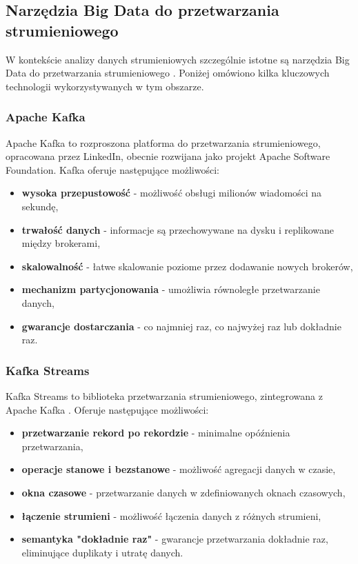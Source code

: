 \subsection{Narzędzia Big Data do przetwarzania strumieniowego}
\label{subsec:narzedzia_big_data}

W kontekście analizy danych strumieniowych szczególnie istotne są narzędzia Big Data do przetwarzania strumieniowego \cite{spark_streaming}.
Poniżej omówiono kilka kluczowych technologii wykorzystywanych w tym obszarze.

\subsubsection{Apache Kafka}
\label{subsubsec:apache_kafka}

Apache Kafka \cite{kafka} to rozproszona platforma do przetwarzania strumieniowego, opracowana przez LinkedIn, obecnie rozwijana jako projekt
Apache Software Foundation. Kafka oferuje następujące możliwości:

\begin{itemize}
    \item \textbf{wysoka przepustowość} - możliwość obsługi milionów wiadomości na sekundę,
    \item \textbf{trwałość danych} - informacje są przechowywane na dysku i replikowane między brokerami,
    \item \textbf{skalowalność} - łatwe skalowanie poziome przez dodawanie nowych brokerów,
    \item \textbf{mechanizm partycjonowania} - umożliwia równoległe przetwarzanie danych,
    \item \textbf{gwarancje dostarczania} - co najmniej raz, co najwyżej raz lub dokładnie raz.
\end{itemize}

\subsubsection{Kafka Streams}
\label{subsubsec:kafka_streams}

Kafka Streams to biblioteka przetwarzania strumieniowego, zintegrowana z Apache Kafka \cite{kafka_streams}. Oferuje następujące możliwości:

\begin{itemize}
    \item \textbf{przetwarzanie rekord po rekordzie} - minimalne opóźnienia przetwarzania,
    \item \textbf{operacje stanowe i bezstanowe} - możliwość agregacji danych w czasie,
    \item \textbf{okna czasowe} - przetwarzanie danych w zdefiniowanych oknach czasowych,
    \item \textbf{łączenie strumieni} - możliwość łączenia danych z różnych strumieni,
    \item \textbf{semantyka "dokładnie raz"} - gwarancje przetwarzania dokładnie raz, eliminujące duplikaty i utratę danych.
\end{itemize}

